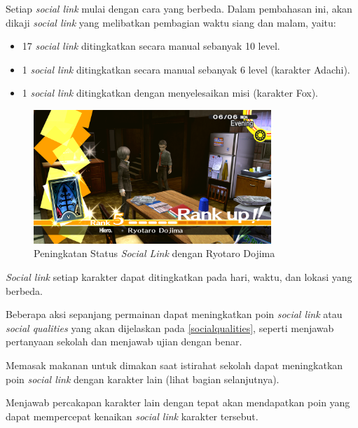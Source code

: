 \begin{enumerate}
    {\item Setiap \textit{social link} mulai dengan cara yang berbeda. Dalam pembahasan ini, akan dikaji \textit{social link} yang melibatkan pembagian waktu siang dan malam, yaitu:
          \begin{itemize}
              \item 17 \textit{social link} ditingkatkan secara manual sebanyak 10 level.
              \item 1 \textit{social link} ditingkatkan secara manual sebanyak 6 level (karakter Adachi).
              \item 1 \textit{social link} ditingkatkan dengan menyelesaikan misi (karakter Fox).
          \end{itemize}
          }
          \begin{figure}[htbp]
              \centering
              \includegraphics[width=0.8\textwidth]{resources/Dokumentasi/Screenshot (402).png}
              \caption{\label{dojima}Peningkatan Status \textit{Social Link} dengan Ryotaro Dojima}
          \end{figure}
    \item \textit{Social link} setiap karakter dapat ditingkatkan pada hari, waktu, dan lokasi yang berbeda.
    \item Beberapa aksi sepanjang permainan dapat meningkatkan poin \textit{social link} atau \textit{social qualities} yang akan dijelaskan pada \autoref{socialqualities}, seperti menjawab pertanyaan sekolah dan menjawab ujian dengan benar.
    \item Memasak makanan untuk dimakan saat istirahat sekolah dapat meningkatkan poin \textit{social link} dengan karakter lain (lihat bagian selanjutnya).
    \item Menjawab percakapan karakter lain dengan tepat akan mendapatkan poin yang dapat mempercepat kenaikan \textit{social link} karakter tersebut.
\end{enumerate}


